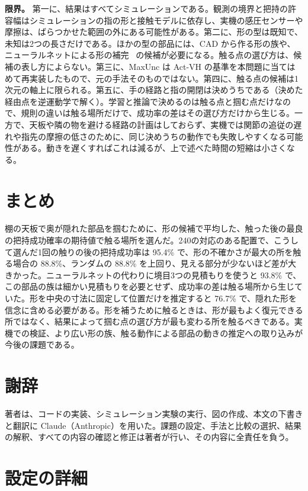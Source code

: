 \documentclass[conference]{IEEEtran}
\newcommand{\Unc}{MaxUnc}
\begin{document}
\textbf{限界。} 第一に、結果はすべてシミュレーションである。観測の境界と把持の許容幅はシミュレーションの指の形と接触モデルに依存し、実機の感圧センサーや摩擦は、ばらつかせた範囲の外にある可能性がある。第二に、形の型は既知で、未知は2つの長さだけである。ほかの型の部品には、CAD から作る形の族や、ニューラルネットによる形の補完~\cite{rustler2022actvh,rustler2026shapegrasp} の候補が必要になる。触る点の選び方は、候補の表し方によらない。第三に、\Unc{} は Act-VH の基準を本問題に当てはめて再実装したもので、元の手法そのものではない。第四に、触る点の候補は1次元の軸上に限られる。第五に、手の経路と指の開閉は決めうちである（決めた経由点を逆運動学で解く）。学習と推論で決めるのは触る点と掴む点だけなので、規則の違いは触る場所だけで、成功率の差はその選び方だけから生じる。一方で、天板や隣の物を避ける経路の計画はしておらず、実機では関節の追従の遅れや指先の摩擦の低さのために、同じ決めうちの動作でも失敗しやすくなる可能性がある。動きを遅くすればこれは減るが、上で述べた時間の短縮は小さくなる。

\section{まとめ}

棚の天板で奥が隠れた部品を掴むために、形の候補で平均した、触った後の最良の把持成功確率の期待値で触る場所を選んだ。240の対応のある配置で、こうして選んだ1回の触りの後の把持成功率は 95.4\% で、形の不確かさが最大の所を触る場合の 88.8\%、ランダムの 88.8\% を上回り、見える部分が少ないほど差が大きかった。ニューラルネットの代わりに境目3つの見積もりを使うと 93.8\% で、この部品の族は細かい見積もりを必要とせず、成功率の差は触る場所から生じていた。形を中央の寸法に固定して位置だけを推定すると 76.7\% で、隠れた形を信念に含める必要がある。形を補うために触るときは、形が最もよく復元できる所ではなく、結果によって掴む点の選び方が最も変わる所を触るべきである。実機での検証、より広い形の族、触る動作による部品の動きの推定への取り込みが今後の課題である。

\section*{謝辞}
著者は、コードの実装、シミュレーション実験の実行、図の作成、本文の下書きと翻訳に Claude（Anthropic）を用いた。課題の設定、手法と比較の選択、結果の解釈、すべての内容の確認と修正は著者が行い、その内容に全責任を負う。




\appendix

\section{設定の詳細}\label{app:setup}
\end{document}
